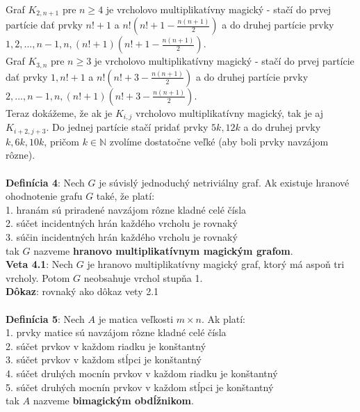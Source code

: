 \documentclass[12pt]{article}
\begin{document}
Graf $K_{2,n+1}$ pre $n \geq 4$ je vrcholovo multiplikatívny magický - stačí do prvej partície dať prvky $n! + 1$ a $n! (n! + 1 - \frac{n(n+1)}{2})$ a do druhej partície prvky $1, 2, ... , n-1, n, (n! + 1) (n! + 1 - \frac{n(n+1)}{2})$. \\

Graf $K_{3,n}$ pre $n \geq 3$ je vrcholovo multiplikatívny magický - stačí do prvej partície dať prvky $1, n! + 1$ a $n! (n! + 3 - \frac{n(n+1)}{2})$ a do druhej partície prvky $2, ... , n-1, n, (n! + 1) (n! + 3 - \frac{n(n+1)}{2})$. \\

Teraz dokážeme, že ak je $K_{i,j}$ vrcholovo multiplikatívny magický, tak je aj $K_{i+2,j+3}$. Do jednej partície stačí pridať prvky $5k, 12k$ a do druhej prvky $k, 6k, 10k$, pričom $k \in \mathbb{N}$ zvolíme dostatočne veľké (aby boli prvky navzájom rôzne). \\\\ 

\textbf{Definícia 4}: Nech $G$ je súvislý jednoduchý netriviálny graf. Ak existuje hranové ohodnotenie grafu $G$ také, že platí: \\
1. hranám sú priradené navzájom rôzne kladné celé čísla \\
2. súčet incidentných hrán každého vrcholu je rovnaký \\
3. súčin incidentných hrán každého vrcholu je rovnaký \\
tak $G$ nazveme \textbf{hranovo multiplikatívnym magickým grafom}. \\

\textbf{Veta 4.1}: Nech $G$ je hranovo multiplikatívny magický graf, ktorý má aspoň tri vrcholy. Potom $G$ neobsahuje vrchol stupňa 1. \\

\textbf{Dôkaz}: rovnaký ako dôkaz vety 2.1 \\\\

\textbf{Definícia 5}: Nech $A$ je matica veľkosti $m \times n$. Ak platí: \\
1. prvky matice sú navzájom rôzne kladné celé čísla \\
2. súčet prvkov v každom riadku je konštantný \\
3. súčet prvkov v každom stĺpci je konštantný \\
4. súčet druhých mocnín prvkov v každom riadku je konštantný \\
5. súčet druhých mocnín prvkov v každom stĺpci je konštantný \\
tak $A$ nazveme \textbf{bimagickým obdĺžnikom}. \\
\end{document}
